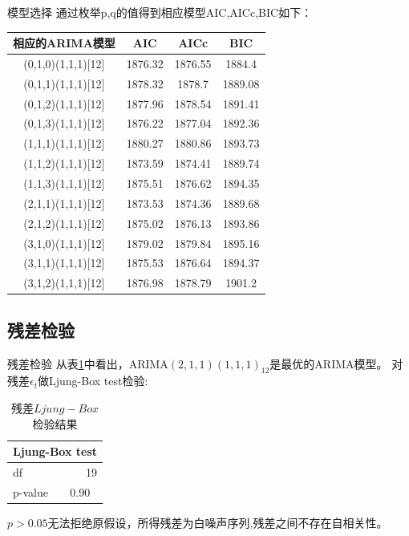 \documentclass[10pt]{beamer}
\begin{document}
\begin{frame}{模型选择}
  通过枚举p,q的值得到相应模型AIC,AICc,BIC如下：
  \begin{table}[htbp]
    \centering
      \begin{tabular}{c|ccc}
      相应的ARIMA模型 & AIC   & AICc  & BIC \\
      \hline
      (0,1,0)(1,1,1)[12] & 1876.32 & 1876.55 & 1884.4 \\
      (0,1,1)(1,1,1)[12] & 1878.32 & 1878.7 & 1889.08 \\
      (0,1,2)(1,1,1)[12] & 1877.96 & 1878.54 & 1891.41 \\
      (0,1,3)(1,1,1)[12]  & 1876.22 & 1877.04 & 1892.36 \\
      (1,1,1)(1,1,1)[12] & 1880.27 & 1880.86 & 1893.73 \\
      (1,1,2)(1,1,1)[12] & 1873.59 & 1874.41 & 1889.74 \\
      (1,1,3)(1,1,1)[12] & 1875.51 & 1876.62 & 1894.35 \\
      (2,1,1)(1,1,1)[12] & 1873.53 & 1874.36 & 1889.68 \\
      (2,1,2)(1,1,1)[12] & 1875.02 & 1876.13 & 1893.86 \\
      (3,1,0)(1,1,1)[12] & 1879.02 & 1879.84 & 1895.16 \\
      (3,1,1)(1,1,1)[12] & 1875.53 & 1876.64 & 1894.37 \\
      (3,1,2)(1,1,1)[12] & 1876.98 & 1878.79 & 1901.2 \\
      \end{tabular}%
    \label{choose optimal models}%
  \end{table}%
\end{frame}

\subsection{残差检验}

\begin{frame}{残差检验}
  从表\ref{choose optimal models}中看出，ARIMA\((2,1,1)(1,1,1)_{12}\)是最优的ARIMA模型。
  对残差\(\epsilon_t\)做Ljung-Box test检验:

  \begin{table}[H]
    \centering
    \caption{残差\(Ljung-Box\)检验结果}
      \begin{tabular}{l|l}
      \multicolumn{2}{c}{Ljung-Box test} \\
      \hline
      df    & \multicolumn{1}{r}{19} \\
      p-value & 0.90 \\
      \end{tabular}%
    \label{Ljung-Box of Residuals}%
  \end{table}%

  \(p>0.05\)无法拒绝原假设，所得残差为白噪声序列,残差之间不存在自相关性。
\end{frame}
\end{document}
